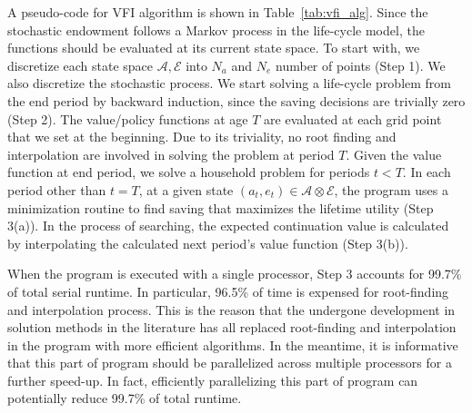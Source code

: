 \documentclass[12pt]{article}
\begin{document}
A pseudo-code for VFI algorithm is shown in Table~\ref{tab:vfi_alg}. Since the stochastic endowment follows a Markov process in the life-cycle model, the functions should be evaluated at its current state space. To start with, we discretize each state space $\mathcal{A}, \mathcal{E}$ into $N_a$ and $N_e$ number of points (Step 1). We also discretize the stochastic process. We start solving a life-cycle problem from the end period by backward induction, since the saving decisions are trivially zero (Step 2). The value/policy functions at age $T$ are evaluated at each grid point that we set at the beginning. Due to its triviality, no root finding and interpolation are involved in solving the problem at period $T$. Given the value function at end period, we solve a household problem for periods $t<T$. In each period other than $t=T$, at a given state $(a_t,e_t)\in\mathcal{A} \otimes \mathcal{E}$, the program uses a minimization routine to find saving that maximizes the lifetime utility (Step 3(a)). In the process of searching, the expected continuation value is calculated by interpolating the calculated next period's value function (Step 3(b)). 

When the program is executed with a single processor, Step 3 accounts for 99.7\% of total serial runtime. In particular, 96.5\% of time is expensed for root-finding and interpolation process. 
This is the reason that the undergone development in solution methods in the literature has all replaced root-finding and interpolation in the program with more efficient algorithms. In the meantime, it is informative that this part of program should be parallelized across multiple processors for a further speed-up. In fact, efficiently parallelizing this part of program can potentially reduce 99.7\% of total runtime.
\end{document}
